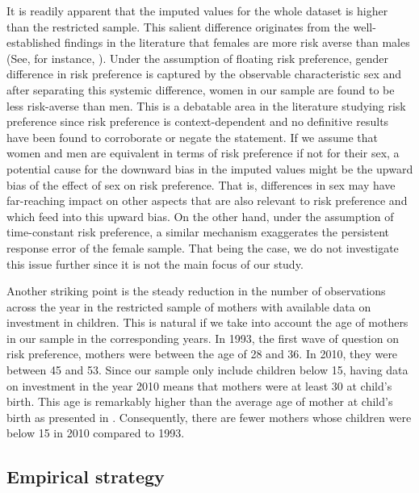 \documentclass[]{article}
\begin{document}
It is readily apparent that the imputed values for the whole dataset is higher than the restricted sample. This salient difference originates from the well-established findings in the literature that females are more risk averse than males (See, for instance, \citet{croson2009gender, jianakoplos1998women, powell1997gender}). Under the assumption of floating risk preference, gender difference in risk preference is captured by the observable characteristic sex and after separating this systemic difference, women in our sample are found to be less risk-averse than men. This is a debatable area in the literature studying risk preference since risk preference is context-dependent and no definitive results have been found to corroborate or negate the statement. If we assume that women and men are equivalent in terms of risk preference if not for their sex, a potential cause for the downward bias in the imputed values might be the upward bias of the effect of sex on risk preference. That is, differences in sex may have far-reaching impact on other aspects that are also relevant to risk preference and which feed into this upward bias.  On the other hand, under the assumption of time-constant risk preference, a similar mechanism exaggerates the persistent response error of the female sample. That being the case, we do not investigate this issue further since it is not the main focus of our study.  

Another striking point is the steady reduction in the number of observations across the year in the restricted sample of mothers with available data on investment in children. This is natural if we take into account the age of mothers in our sample in the corresponding years. In 1993, the first wave of question on risk preference, mothers were between the age of 28 and 36. In 2010, they were between 45 and 53. Since our sample only include children below 15, having data on investment in the year 2010 means that mothers were at least 30 at child's birth. This age is remarkably higher than the average age of mother at child's birth as presented in . Consequently, there are fewer mothers whose children were below 15 in 2010 compared to 1993. 


\subsection{Empirical strategy}



\end{document}
